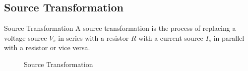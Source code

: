 \documentclass[12pt]{article}
\begin{document}
\subsection{Source Transformation}
\label{ssec:sourceTransformation}

\begin{definition}{Source Transformation}
  A source transformation is the process of replacing a voltage source $V_s$ in series with a resistor $R$ with a current source $I_s$ in parallel with a resistor or vice versa.
\end{definition}

\begin{figure}[H]
  \centering
  
  \caption{Source Transformation}
  \label{fig:014}
\end{figure}
\end{document}
